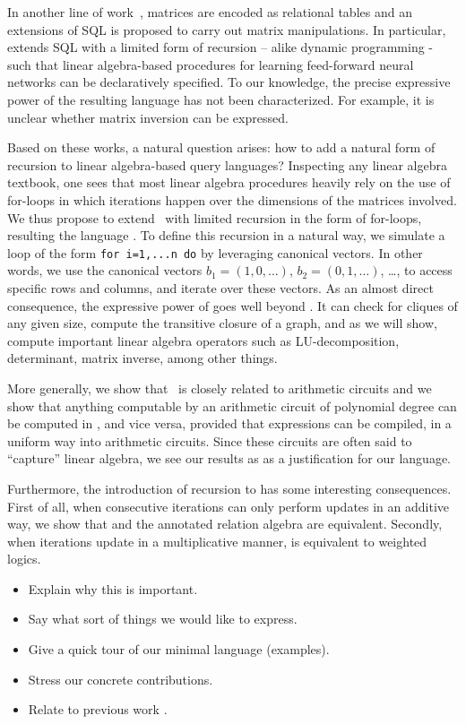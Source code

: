 In another line of work~\cite{}, matrices are encoded as relational tables and an extensions of SQL is proposed to carry out matrix manipulations. In particular, \cite{} extends SQL with a limited form of recursion -- alike dynamic programming - such that linear algebra-based procedures for learning feed-forward neural networks can be declaratively specified. To our knowledge, the precise expressive power of the resulting language has not been characterized. For example, it is unclear whether matrix inversion can be expressed.

Based on these works, a natural question arises: how to add a natural form of recursion to linear algebra-based query languages? Inspecting any linear algebra textbook, one sees that most linear algebra procedures heavily rely on the use of for-loops in which iterations happen over the dimensions of the matrices involved. We thus propose to extend \lang\ with limited recursion in the form of for-loops, resulting the language \langfor. To define this recursion in a natural way, we simulate a loop of the form \texttt{for i=1,...n do} by leveraging canonical vectors. In other words, we use the canonical vectors $b_1=(1,0,\ldots)$, $b_2=(0,1,\ldots)$, \ldots, to access specific rows and columns, and iterate over these vectors. As an almost direct consequence, the expressive power of \langfor goes well beyond \lang. It can check for cliques of any given size, compute the transitive closure of a graph, and as we will show, compute important linear algebra operators such as LU-decomposition, determinant, matrix inverse, among other things.

More generally, we show that \langfor\ is closely related to arithmetic circuits and we show that anything computable by an arithmetic circuit of polynomial degree can be computed in \langfor, and vice versa, provided that \langfor expressions can be compiled, in a uniform way into arithmetic circuits. Since these circuits are often said to ``capture'' linear algebra, we see our results as as a justification for our language.

Furthermore, the introduction of recursion to \lang has some interesting consequences. First of all, when consecutive iterations can only perform updates in an additive way, we show that \langfor and the annotated relation algebra are equivalent. Secondly, when iterations update in a multiplicative manner,
\langfor is equivalent to weighted logics. 



\begin{itemize}
\item Explain why this is important.
\item Say what sort of things we would like to express.
\item Give a quick tour of our minimal language (examples).
\item Stress our concrete contributions.
\item Relate to previous work \cite{matlang,BrijderGBW19,Geerts19,HutchisonHS17}.
\end{itemize}


